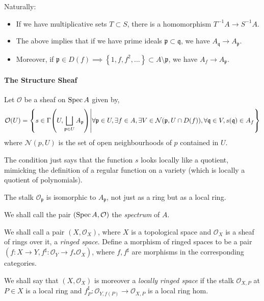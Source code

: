 \documentclass[000-main.tex]{subfiles}
\begin{document}
Naturally:
\begin{itemize}
  \item If we have multiplicative sets $T \subset S$, there is a homomorphism $T^{-1}A \to S^{-1}A$.
  \item The above implies that if we have prime ideals $\mathfrak{p}\subset\mathfrak{q}$, we have $A_\mathfrak{q} \to A_\mathfrak{p}$.
  \item Moreover, if $\mathfrak{p}\in D(f) \implies \left\{ 1, f, f^2, \ldots \right\}\subset A\setminus\mathfrak{p}$, we have $A_f \to A_\mathfrak{p}$.
\end{itemize}

\paragraph{The Structure Sheaf}

\begin{definition}
  Let $\mathcal{O}$ be a sheaf on $\operatorname{Spec} A$ given by,
  \[
    \mathcal{O}(U) = \qty{
      s \in \Gamma\qty(U, \bigsqcup_{\mathfrak{p} \in U} A_{\mathfrak{p}})
      \middle\vert
      \forall \mathfrak{p}\in U,
      \exists f \in A,
      \exists V\in \mathcal{N}(\mathfrak{p}, U\cap D(f)),
      \forall \mathfrak{q} \in V, s(\mathfrak{q}) \in A_f
    }
  \]
  where $\mathcal{N}(p, U)$ is the set of open neighbourhoods of $p$ contained in $U$.
\end{definition}
The condition just says that the function $s$ looks locally like a quotient, mimicking the definition of a regular function on a variety (which is locally a quotient of polynomials).

\begin{lemma}
  The stalk $\mathcal{O}_{\mathfrak{p}}$ is isomorphic to $A_{\mathfrak{p}}$, not just as a ring but as a local ring.
\end{lemma}

We shall call the pair $(\operatorname{Spec} A, \mathcal{O})$ the \emph{spectrum} of $A$. 

\begin{definition}
  We shall call a pair $(X, \mathcal{O}_X)$, where $X$ is a topological space and $\mathcal{O}_X$ is a sheaf of rings over it, a \emph{ringed space}.
  Define a morphism of ringed spaces to be a pair $(f : X \to Y, f^\sharp : \mathcal{O}_Y \to f_\ast \mathcal{O}_X)$, where $f, f^\sharp$ are morphisms in the corresponding categories.

  We shall say that $(X, \mathcal{O}_X)$ is moreover a \emph{locally ringed space} if the stalk $\mathcal{O}_{X, P}$ at $P \in X$ is a local ring and $f^\sharp_P : \mathcal{O}_{Y, f(P)} \to \mathcal{O}_{X, P}$ is a local ring hom.
\end{definition}
\end{document}
